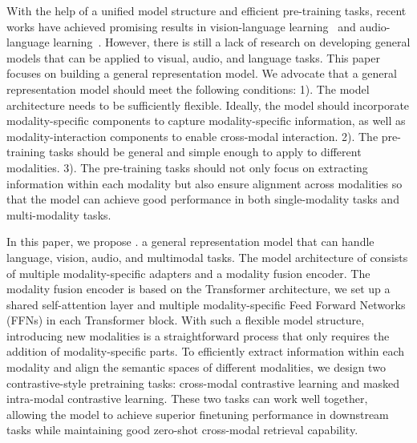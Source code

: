 With the help of a unified model structure and efficient pre-training tasks, recent works have achieved promising results in vision-language learning~\cite{ofa,flamingo,coca,beit3,blip,pali} and audio-language learning~\cite{audioclip,wav2clip,clap,speecht5,speechlm}. However, there is still a lack of research on developing general models that can be applied to visual, audio, and language tasks. This paper focuses on building a general representation model. We advocate that a general representation model should meet the following conditions:
1). The model architecture needs to be sufficiently flexible. Ideally, the model should incorporate modality-specific components to capture modality-specific information, as well as modality-interaction components to enable cross-modal interaction.
2). The pre-training tasks should be general and simple enough to apply to different modalities. 
3). The pre-training tasks should not only focus on extracting information within each modality but also ensure alignment across modalities so that the model can achieve good performance in both single-modality tasks and multi-modality tasks.


In this paper, we propose \onepeace. a general representation model that can handle language, vision, audio, and multimodal tasks. 
The model architecture of \onepeace consists of multiple modality-specific adapters and a modality fusion encoder. The modality fusion encoder is based on the Transformer architecture, we set up a shared self-attention layer and multiple modality-specific Feed Forward Networks (FFNs) in each Transformer block.
With such a flexible model structure, introducing new modalities is a straightforward process that only requires the addition of modality-specific parts.
To efficiently extract information within each modality and align the semantic spaces of different modalities, we design two contrastive-style pretraining tasks: cross-modal contrastive learning and masked intra-modal contrastive learning. These two tasks can work well together, allowing the model to achieve superior finetuning performance in downstream tasks while maintaining good zero-shot cross-modal retrieval capability.

